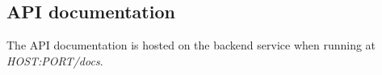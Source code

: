 \subsection{API documentation} \label{apidocs}
The API documentation is hosted on the backend service when running at \emph{HOST:PORT/docs}.
